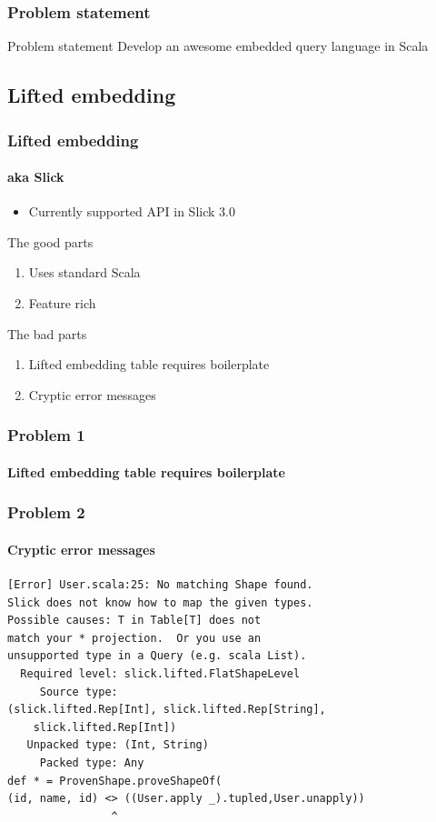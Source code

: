 \documentclass[xcolor=dvipsnames]{beamer}
\theoremstyle{definition}
\begin{document}
\begin{frame}[fragile]
    \frametitle{Problem statement}
    \begin{block}{Problem statement}
        Develop an awesome embedded query language in Scala
    \end{block}
\end{frame}

\subsection{Lifted embedding} %
\label{sub:Liftedembedding}

\begin{frame}[fragile]
    \frametitle{Lifted embedding}
    \framesubtitle{aka Slick}
    \begin{itemize}
        \item Currently supported API in Slick 3.0
    \end{itemize}
    \begin{block}{The good parts}
        \begin{enumerate}
            \item Uses standard Scala
            \item Feature rich
        \end{enumerate}
    \end{block}
    \begin{block}{The bad parts}
        \begin{enumerate}
            \item Lifted embedding table requires boilerplate
            \item Cryptic error messages
        \end{enumerate}
    \end{block}
\end{frame}

\begin{frame}[fragile]
    \frametitle{Problem 1}
    \framesubtitle{Lifted embedding table requires boilerplate}
    
\end{frame}

\begin{frame}[fragile]
    \frametitle{Problem 2}
    \framesubtitle{Cryptic error messages}
    \begin{verbatim}
[Error] User.scala:25: No matching Shape found.
Slick does not know how to map the given types.
Possible causes: T in Table[T] does not
match your * projection.  Or you use an
unsupported type in a Query (e.g. scala List).
  Required level: slick.lifted.FlatShapeLevel
     Source type:
(slick.lifted.Rep[Int], slick.lifted.Rep[String],
    slick.lifted.Rep[Int])
   Unpacked type: (Int, String)
     Packed type: Any
def * = ProvenShape.proveShapeOf(
(id, name, id) <> ((User.apply _).tupled,User.unapply))
                ^
    \end{verbatim}
\end{frame}
\end{document}
